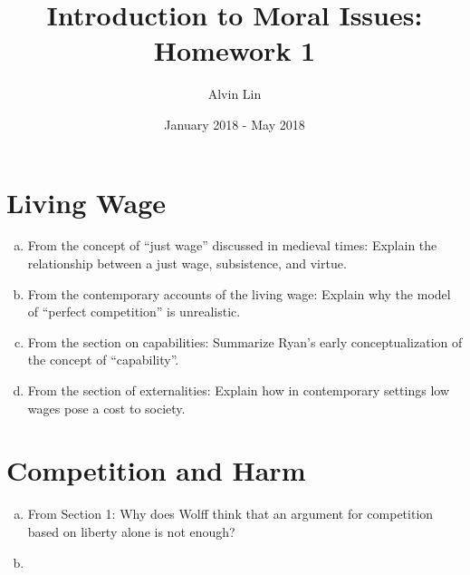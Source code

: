\documentclass{article}
\title{Introduction to Moral Issues: Homework 1}
\author{Alvin Lin}
\date{January 2018 - May 2018}
\begin{document}
\maketitle

\section*{Living Wage}
\begin{enumerate}[a)]
  \item From the concept of ``just wage'' discussed in medieval times: Explain the relationship between a just wage, subsistence, and virtue.
  \item From the contemporary accounts of the living wage: Explain why the model of ``perfect competition'' is unrealistic.
  \item From the section on capabilities: Summarize Ryan's early conceptualization of the concept of ``capability''.
  \item From the section of externalities: Explain how in contemporary settings low wages pose a cost to society.
\end{enumerate}

\section*{Competition and Harm}
\begin{enumerate}[a)]
  \item From Section 1: Why does Wolff think that an argument for competition based on liberty alone is not enough?
  \item
\end{enumerate}
\end{document}
